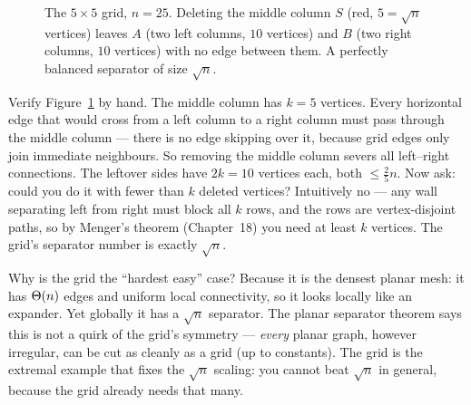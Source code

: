 \begin{figure}[H]
\centering
{}
\caption{The $5\times 5$ grid, $n=25$. Deleting the middle column $S$ (red, $5=\sqrt n$ vertices) leaves $A$ (two left columns, $10$ vertices) and $B$ (two right columns, $10$ vertices) with no edge between them. A perfectly balanced separator of size $\sqrt n$.}
\label{ch27:fig-grid}
\end{figure}

\begin{labbox}
Verify Figure~\ref{ch27:fig-grid} by hand. The middle column has $k=5$ vertices. Every horizontal edge that would cross from a left column to a right column must pass through the middle column --- there is no edge skipping over it, because grid edges only join immediate neighbours. So removing the middle column severs all left--right connections. The leftover sides have $2k=10$ vertices each, both $\le \tfrac{2}{5} n$. Now ask: could you do it with fewer than $k$ deleted vertices? Intuitively no --- any wall separating left from right must block all $k$ rows, and the rows are vertex-disjoint paths, so by Menger's theorem (Chapter~18) you need at least $k$ vertices. The grid's separator number is exactly $\sqrt n$.
\end{labbox}

\begin{whybox}
Why is the grid the ``hardest easy'' case? Because it is the densest planar mesh: it has $\Theta(n)$ edges and uniform local connectivity, so it looks locally like an expander. Yet globally it has a $\sqrt n$ separator. The planar separator theorem says this is not a quirk of the grid's symmetry --- \emph{every} planar graph, however irregular, can be cut as cleanly as a grid (up to constants). The grid is the extremal example that fixes the $\sqrt n$ scaling: you cannot beat $\sqrt n$ in general, because the grid already needs that many.
\end{whybox}

